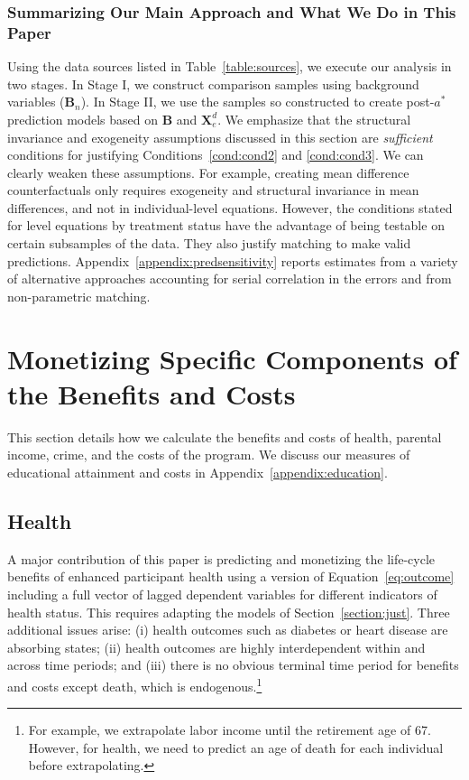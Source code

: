 \subsubsection{Summarizing Our Main Approach and What We Do in This Paper}

Using the data sources listed in Table~\ref{table:sources}, we execute our analysis in two stages. In Stage I, we construct comparison samples using background variables ($\bm{B}_n$). In Stage II, we use the samples so constructed to create post-$a^\ast$ prediction models based on $\bm{B}$ and $\bm{X}^d_e$. We emphasize that the structural invariance and exogeneity assumptions discussed in this section are \emph{sufficient} conditions for justifying Conditions~\ref{cond:cond2} and \ref{cond:cond3}. We can clearly weaken these assumptions. For example, creating mean difference counterfactuals only requires exogeneity and structural invariance in mean differences, and not in individual-level equations. However, the conditions stated for level equations by treatment status have the advantage of being testable on certain subsamples of the data. They also justify matching to make valid predictions.  Appendix~\ref{appendix:predsensitivity} reports estimates from a variety of alternative approaches accounting for serial correlation in the errors and from non-parametric matching. 

\section{Monetizing Specific Components of the Benefits and Costs}
\label{section:monetizing-benefits-costs}

This section details how we calculate the benefits and costs of health, parental income, crime, and the costs of the program. We discuss our measures of educational attainment and costs in Appendix~\ref{appendix:education}. 

\subsection{Health} \label{section:health}

A major contribution of this paper is predicting and monetizing the life-cycle benefits of enhanced participant health using a version of Equation~\eqref{eq:outcome} including a full vector of lagged dependent variables for different indicators of health status. This requires adapting the models of Section~\ref{section:just}. Three additional issues arise: (i) health outcomes such as diabetes or heart disease are absorbing states; (ii) health outcomes are highly interdependent within and across time periods; and (iii) there is no obvious terminal time period for benefits and costs except death, which is endogenous.\footnote{For example, we extrapolate labor income until the retirement age of 67. However, for health, we need to predict an age of death for each individual before extrapolating.}


